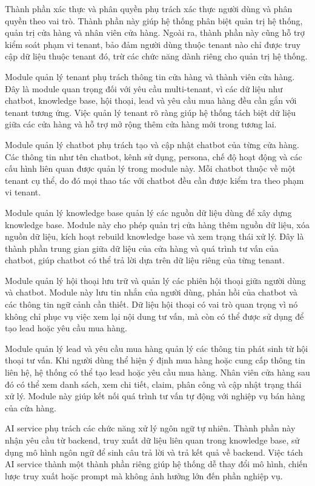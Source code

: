 \documentclass[../DoAn.tex]{subfiles}
\begin{document}
Thành phần xác thực và phân quyền phụ trách xác thực người dùng và phân quyền theo vai trò. Thành phần này giúp hệ thống phân biệt quản trị hệ thống, quản trị cửa hàng và nhân viên cửa hàng. Ngoài ra, thành phần này cũng hỗ trợ kiểm soát phạm vi tenant, bảo đảm người dùng thuộc tenant nào chỉ được truy cập dữ liệu thuộc tenant đó, trừ các chức năng dành riêng cho quản trị hệ thống.

Module quản lý tenant phụ trách thông tin cửa hàng và thành viên cửa hàng. Đây là module quan trọng đối với yêu cầu multi-tenant, vì các dữ liệu như chatbot, knowledge base, hội thoại, lead và yêu cầu mua hàng đều cần gắn với tenant tương ứng. Việc quản lý tenant rõ ràng giúp hệ thống tách biệt dữ liệu giữa các cửa hàng và hỗ trợ mở rộng thêm cửa hàng mới trong tương lai.

Module quản lý chatbot phụ trách tạo và cập nhật chatbot của từng cửa hàng. Các thông tin như tên chatbot, kênh sử dụng, persona, chế độ hoạt động và các cấu hình liên quan được quản lý trong module này. Mỗi chatbot thuộc về một tenant cụ thể, do đó mọi thao tác với chatbot đều cần được kiểm tra theo phạm vi tenant.

Module quản lý knowledge base quản lý các nguồn dữ liệu dùng để xây dựng knowledge base. Module này cho phép quản trị cửa hàng thêm nguồn dữ liệu, xóa nguồn dữ liệu, kích hoạt rebuild knowledge base và xem trạng thái xử lý. Đây là thành phần trung gian giữa dữ liệu của cửa hàng và quá trình tư vấn của chatbot, giúp chatbot có thể trả lời dựa trên dữ liệu riêng của từng tenant.

Module quản lý hội thoại lưu trữ và quản lý các phiên hội thoại giữa người dùng và chatbot. Module này lưu tin nhắn của người dùng, phản hồi của chatbot và các thông tin ngữ cảnh cần thiết. Dữ liệu hội thoại có vai trò quan trọng vì nó không chỉ phục vụ việc xem lại nội dung tư vấn, mà còn có thể được sử dụng để tạo lead hoặc yêu cầu mua hàng.

Module quản lý lead và yêu cầu mua hàng quản lý các thông tin phát sinh từ hội thoại tư vấn. Khi người dùng thể hiện ý định mua hàng hoặc cung cấp thông tin liên hệ, hệ thống có thể tạo lead hoặc yêu cầu mua hàng. Nhân viên cửa hàng sau đó có thể xem danh sách, xem chi tiết, claim, phân công và cập nhật trạng thái xử lý. Module này giúp kết nối quá trình tư vấn tự động với nghiệp vụ bán hàng của cửa hàng.

AI service phụ trách các chức năng xử lý ngôn ngữ tự nhiên. Thành phần này nhận yêu cầu từ backend, truy xuất dữ liệu liên quan trong knowledge base, sử dụng mô hình ngôn ngữ để sinh câu trả lời và trả kết quả về backend. Việc tách AI service thành một thành phần riêng giúp hệ thống dễ thay đổi mô hình, chiến lược truy xuất hoặc prompt mà không ảnh hưởng lớn đến phần nghiệp vụ.
\end{document}
